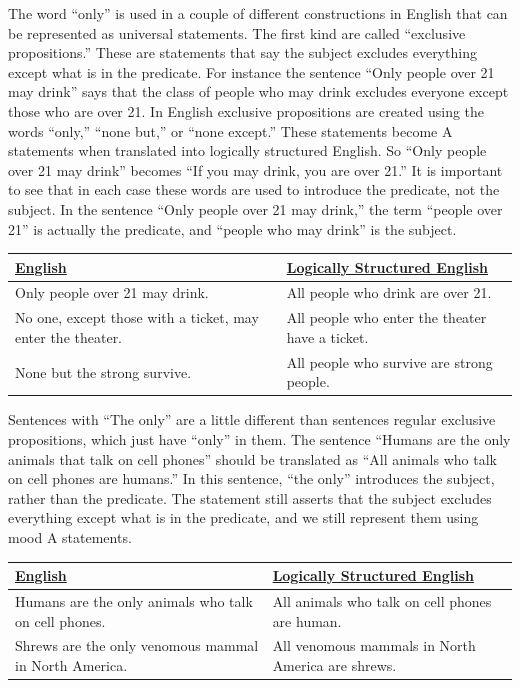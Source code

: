 The word ``only'' is used in a couple of different constructions in English that can be represented as universal statements. The first kind are called ``exclusive propositions.'' These are statements that say the subject excludes everything except what is in the predicate. For instance the sentence ``Only people over 21 may drink'' says that the class of people who may drink excludes everyone except those who are over 21. In English exclusive propositions are created using the words ``only,'' ``none but,'' or ``none except.'' These statements become A statements when translated into logically structured English. So ``Only people over 21 may drink'' becomes ``If you may drink, you  are over 21.'' It is important to see that in each case these words are used to introduce the predicate, not the subject. In the sentence ``Only people over 21 may drink,'' the term ``people over 21'' is actually the  predicate, and ``people who may drink'' is the subject.

\begin{longtabu}{p{.5\linewidth}p{.5\linewidth}}
\underline{English} &
\underline{Logically Structured English} \\
\endhead
Only people over 21 may drink. &
All people who drink are over 21.\\

No one, except those with a ticket, may enter the theater. &
All people who enter the theater have a ticket. \\

None but the strong survive. &
All people who survive are strong people. \\
\end{longtabu}


Sentences with ``The only'' are a little different than sentences regular exclusive propositions, which just have ``only'' in them. The sentence ``Humans are the only animals that talk on cell phones'' should be translated as ``All animals who talk on cell phones are humans.'' In this sentence, ``the only'' introduces the subject, rather than the predicate. The statement still asserts that the subject excludes everything except what is in the predicate, and we still represent them using mood A statements.

\begin{longtabu}{p{.5\linewidth}p{.5\linewidth}}
\underline{English} &
\underline{Logically Structured English} \\
\endhead
Humans are the only animals who talk on cell phones. &
All animals who talk on cell phones are human.\\

Shrews are the only venomous mammal in North America. &
All venomous mammals in North America are shrews.\\

\end{longtabu}

